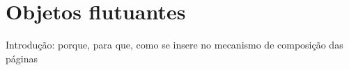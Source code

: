 \section{Objetos flutuantes}\label{sec:floats}

Introdução: porque, para que, como se insere no mecanismo de
composição das páginas
